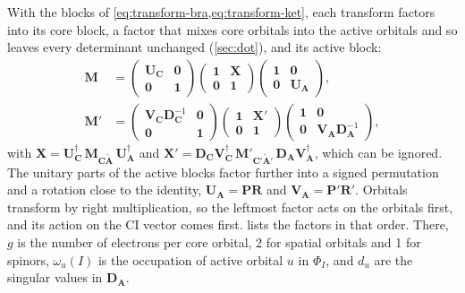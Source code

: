 \documentclass[aip,jcp,preprint]{revtex4-1}
\newcommand{\bvec}[1]{\mathbf{#1}}
\begin{document}
With the blocks of \cref{eq:transform-bra,eq:transform-ket}, each transform factors into its core block, a factor that mixes core orbitals into the active orbitals and so leaves every determinant unchanged (\cref{sec:dot}), and its active block:
\begin{align}
 \bvec{M} &=
 \begin{pmatrix} \bvec{U}_{\bvec{C}} & \bvec{0} \\ \bvec{0} & \bvec{1} \end{pmatrix}
 \begin{pmatrix} \bvec{1} & \bvec{X} \\ \bvec{0} & \bvec{1} \end{pmatrix}
 \begin{pmatrix} \bvec{1} & \bvec{0} \\ \bvec{0} & \bvec{U}_{\bvec{A}} \end{pmatrix},
 \label{eq:factor-bra}\\
 \bvec{M}' &=
 \begin{pmatrix} \bvec{V}_{\bvec{C}}\bvec{D}_{\bvec{C}}^{-1} & \bvec{0} \\
  \bvec{0} & \bvec{1} \end{pmatrix}
 \begin{pmatrix} \bvec{1} & \bvec{X}' \\ \bvec{0} & \bvec{1} \end{pmatrix}
 \begin{pmatrix} \bvec{1} & \bvec{0} \\
  \bvec{0} & \bvec{V}_{\bvec{A}}\bvec{D}_{\bvec{A}}^{-1} \end{pmatrix},
 \label{eq:factor-ket}
\end{align}
with $\bvec{X} = \bvec{U}_{\bvec{C}}^\dagger\, \bvec{M}_{\bvec{C}\tilde{\bvec{A}}}\,\bvec{U}_{\bvec{A}}^\dagger$ and $\bvec{X}' = \bvec{D}_{\bvec{C}}\bvec{V}_{\bvec{C}}^\dagger\, \bvec{M}'_{\bvec{C}'\tilde{\bvec{A}}'}\,\bvec{D}_{\bvec{A}}\bvec{V}_{\bvec{A}}^\dagger$, which can be ignored.
The unitary parts of the active blocks factor further into a signed permutation and a rotation close to the identity, $\bvec{U}_{\bvec{A}} = \bvec{P}\bvec{R}$ and $\bvec{V}_{\bvec{A}} = \bvec{P}'\bvec{R}'$.
Orbitals transform by right multiplication, so the leftmost factor acts on the orbitals first, and its action on the CI vector comes first.
 lists the factors in that order.
There, $g$ is the number of electrons per core orbital, 2 for spatial orbitals and 1 for spinors, $\omega_u(I)$ is the occupation of active orbital $u$ in $\Phi_I$, and $d_u$ are the singular values in $\bvec{D}_{\bvec{A}}$.
\end{document}
